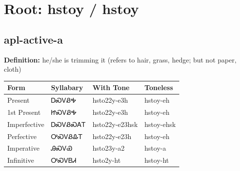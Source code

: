 \documentclass{article}%
\begin{document}
%
\normalsize%
\section*{Root: hstoy / hstoy}%
\subsection*{apl-active-a}%
\textbf{Definition: }%
he/she is trimming it (refers to hair‚ grass‚ hedge; but not paper‚ cloth)%
\\[0.5em]%
\begin{tabular}{|l|l|l|l|}%
\hline%
\textbf{Form}&\textbf{Syllabary}&\textbf{With Tone}&\textbf{Toneless}\\%
\hline%
Present&ᎠᏍᏙᏰᎭ&hsto22y{-}e3h&hstoy{-}eh\\%
1st Present&ᏥᏍᏙᏰᎭ&hsto22y{-}e3h&hstoy{-}eh\\%
Imperfective&ᎠᏍᏙᏰᏍᎪᎢ&hsto22y{-}e23hsk&hstoy{-}ehsk\\%
Perfective&ᎤᏍᏙᏰᎲᎢ&hsto22y{-}e23h&hstoy{-}eh\\%
Imperative&ᎯᏍᏙᏯ&hsto23y{-}a2&hstoy{-}a\\%
Infinitive&ᎤᏍᏙᏴᏗ&hsto2y{-}ht&hstoy{-}ht\\%
\hline%
\end{tabular}%
\\[1em]%
\end{document}
